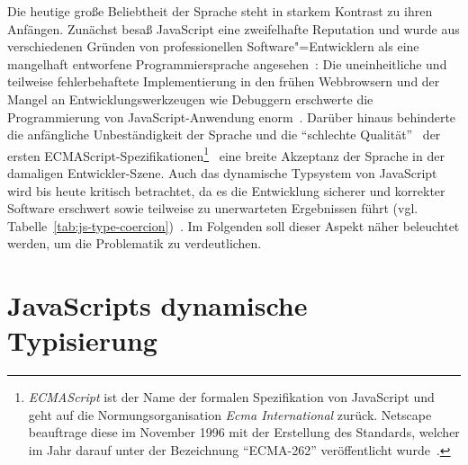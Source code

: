Die heutige große Beliebtheit der Sprache steht in starkem Kontrast zu ihren Anfängen. Zunächst besaß JavaScript eine zweifelhafte Reputation und wurde aus verschiedenen Gründen von professionellen Software"=Entwicklern als eine mangelhaft entworfene Programmiersprache angesehen~\autocite{CROCKFORD:JS_POPULAR}: Die uneinheitliche und teilweise fehlerbehaftete Implementierung in den frühen Webbrowsern und der Mangel an Entwicklungswerkzeugen wie Debuggern erschwerte die Programmierung von JavaScript-Anwendung enorm~\autocite{OREILLY:JS_HOW_DID_WE_GET_THERE}. Darüber hinaus behinderte die anfängliche Unbeständigkeit der Sprache und die \enquote{schlechte Qualität}~\autocite{CROCKFORD:JS_MISUNDERSTOOD} der ersten ECMAScript-Spezifikationen\footnote{\textit{ECMAScript} ist der Name der formalen Spezifikation von JavaScript und geht auf die Normungsorganisation \textit{Ecma International} zurück. Netscape beauftrage diese im November 1996 mit der Erstellung des Standards, welcher im Jahr darauf unter der Bezeichnung \enquote{ECMA-262} veröffentlicht wurde~\autocite{ECMASCRIPT:1997}.}~\autocite{ECMASCRIPT:1997} eine breite Akzeptanz der Sprache in der damaligen Entwickler-Szene. Auch das dynamische Typsystem von JavaScript wird bis heute kritisch betrachtet, da es die Entwicklung sicherer und korrekter Software erschwert sowie teilweise zu unerwarteten Ergebnissen führt (vgl. Tabelle~\ref{tab:js-type-coercion})~\autocite{NIKHIL:2014,PRADEL:2015}. Im Folgenden soll dieser Aspekt näher beleuchtet werden, um die Problematik zu verdeutlichen.



\section{JavaScripts dynamische Typisierung}

